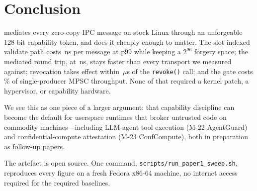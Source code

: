 \section{Conclusion}
\label{sec:conclusion}

\sysnamefull mediates every zero-copy IPC message on stock Linux
through an unforgeable 128-bit capability token, and does it cheaply
enough to matter. The slot-indexed validate path costs
\gateOverheadTail\,ns per message at p99 while keeping a $2^{96}$
forgery space; the mediated round trip, at \gatedAstraRTT\,ns, stays
faster than every transport we measured against; revocation takes
effect within \revokeTail\,$\mu$s of the \texttt{revoke()} call; and
the gate costs \mpscGateCostPercent\% of single-producer MPSC
throughput. None of that required a
kernel patch, a hypervisor, or capability hardware.

We see this as one piece of a larger argument: that capability
discipline can become the default for userspace runtimes that broker
untrusted code on commodity machines---including LLM-agent tool
execution (M-22 AgentGuard) and confidential-compute attestation
(M-23 ConfCompute), both in preparation as follow-up papers.

The artefact is open source. One command,
\texttt{scripts/run\_paper1\_sweep.sh}, reproduces every figure on a
fresh Fedora x86-64 machine, no internet access required for the
required baselines.
